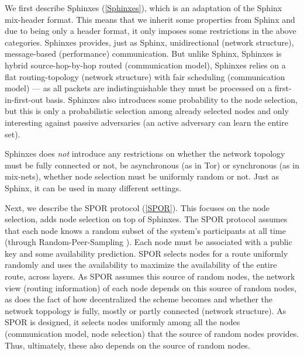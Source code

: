 We first describe Sphinxes (\cref{Sphinxes}), which is an adaptation of the 
Sphinx~\cite{Sphinx} mix-header format.
This means that we inherit some properties from Sphinx and due to being only a 
header format, it only imposes some restrictions in the above categories.
Sphinxes provides, just as Sphinx, unidirectional (network structure), 
message-based (performance) communication.
But unlike Sphinx, Sphinxes is hybrid source-hop-by-hop routed (communication 
model),
Sphinxes relies on a flat routing-topology (network structure) with fair 
scheduling (communication model) --- as all packets are indistinguishable they 
must be processed on a first-in-first-out basis.
Sphinxes also introduces some probability to the node selection, but this is 
only a probabilistic selection among already selected nodes and only 
interesting against passive adversaries (an active adversary can learn the 
entire set).

Sphinxes does \emph{not} introduce any restrictions on whether the network 
topology must be fully connected or not, be asynchronous (as in Tor) or 
synchronous (as in mix-nets), whether node selection must be uniformly random 
or not.
Just as Sphinx, it can be used in many different settings.

Next, we describe the \ac{SPOR} protocol (\cref{SPOR}).
This focuses on the node selection, \ie adds node selection on top of Sphinxes.
The SPOR protocol assumes that each node knows a random subset of the system's participants at all time (\eg through Random-Peer-Sampling \cite{Jelasity_Voulgaris_Guerraoui_Kermarrec_van_Steen_2007}).
Each node must be associated with a public key and some availability 
prediction.
\Ac{SPOR} selects nodes for a route uniformly randomly and uses the 
availability to maximize the availability of the entire route, \ie across 
layers.
As \ac{SPOR} assumes this source of random nodes, the network view (routing 
information) of each node depends on this source of random nodes, as does the 
fact of how decentralized the scheme becomes and whether the network toppology 
is fully, mostly or partly connected (network structure).
As \ac{SPOR} is designed, it selects nodes uniformly among all the nodes 
(communication model, node selection) that the source of random nodes provides.
Thus, ultimately, these also depends on the source of random nodes.

